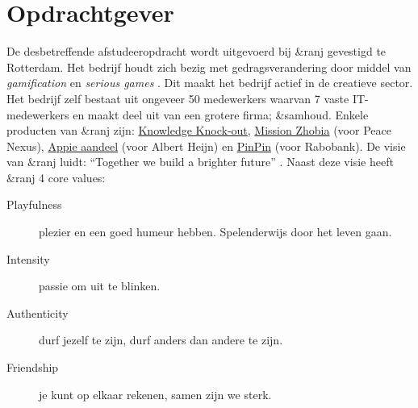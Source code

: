 \documentclass{report}
\newcommand{\organisation}{\&ranj}
\begin{document}
\section{Opdrachtgever}
De desbetreffende afstudeeropdracht wordt uitgevoerd bij \organisation{} gevestigd te Rotterdam. Het bedrijf houdt zich bezig met gedragsverandering door middel van \emph{gamification} en \emph{serious games} \cite{websiteranj}. Dit maakt het bedrijf actief in de creatieve sector.
Het bedrijf zelf bestaat uit ongeveer 50 medewerkers waarvan 7 vaste IT-medewerkers \cite{linkedinranj} en maakt deel uit van een grotere firma; \&samhoud. Enkele producten van \organisation{} zijn: \href{https://ranj.com/products#knowledge-knock-out}{Knowledge Knock-out}, \href{https://ranj.com/projects/corporate/development#mission-zhobia}{Mission Zhobia} (voor Peace Nexus), \href{https://ranj.com/projects/corporate/development#appie-aandeel}{Appie aandeel} (voor Albert Heijn) en \href{https://ranj.com/projects/education#pinpin}{PinPin} (voor Rabobank).
De visie van \organisation{} luidt: ``Together we build a brighter future'' \cite{websiteranj}.
Naast deze visie heeft \organisation{} 4 core values:
\begin{description}
\item[Playfulness] plezier en een goed humeur hebben. Spelenderwijs door het leven gaan.
\item[Intensity] passie om uit te blinken.
\item[Authenticity] durf jezelf te zijn, durf anders dan andere te zijn.
\item[Friendship] je kunt op elkaar rekenen, samen zijn we sterk.
\end{description}
\end{document}
